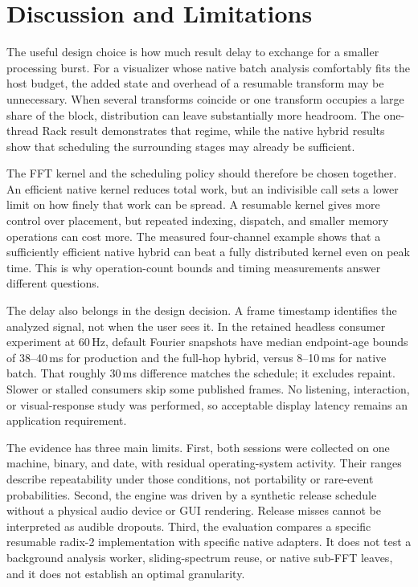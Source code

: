 \section{Discussion and Limitations}
The useful design choice is how much result delay to exchange for a smaller
processing burst. For a visualizer whose native batch analysis comfortably
fits the host budget, the added state and overhead of a resumable transform
may be unnecessary. When several transforms coincide or one transform
occupies a large share of the block, distribution can leave substantially more
headroom. The one-thread Rack result demonstrates that regime, while the
native hybrid results show that scheduling the surrounding stages may already
be sufficient.

The FFT kernel and the scheduling policy should therefore be chosen together.
An efficient native kernel reduces total work, but an indivisible call sets
a lower limit on how finely that work can be spread. A resumable kernel gives
more control over placement, but repeated indexing, dispatch, and smaller
memory operations can cost more. The measured four-channel example shows that
a sufficiently efficient native hybrid can beat a fully distributed kernel
even on peak time. This is why operation-count bounds and timing measurements
answer different questions.

The delay also belongs in the design decision. A frame timestamp identifies
the analyzed signal, not when the user sees it. In the retained headless
consumer experiment at 60\,Hz, default Fourier snapshots have median
endpoint-age bounds of 38--40\,ms for production and the full-hop hybrid,
versus 8--10\,ms for native batch. That roughly 30\,ms difference matches
the schedule; it excludes repaint. Slower or stalled consumers skip some
published frames. No listening, interaction, or visual-response study was
performed, so acceptable display latency remains an application requirement.

The evidence has three main limits. First, both sessions were collected on
one machine, binary, and date, with residual operating-system activity. Their
ranges describe repeatability under those conditions, not portability or
rare-event probabilities. Second, the engine was driven by a synthetic release
schedule without a physical audio device or GUI rendering. Release misses
cannot be interpreted as audible dropouts. Third, the evaluation compares a
specific resumable radix-2 implementation with specific native adapters. It
does not test a background analysis worker, sliding-spectrum reuse, or native
sub-FFT leaves, and it does not establish an optimal granularity.

